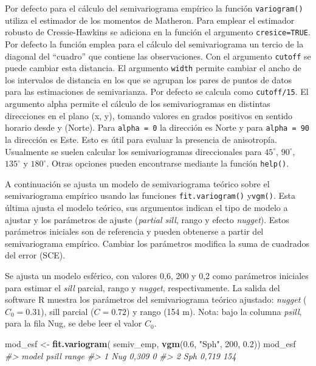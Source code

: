 \documentclass[11pt,b5paper,]{krantz}
\newenvironment{Shaded}{}{}
\newcommand{\CommentTok}[1]{\textcolor[rgb]{0.38,0.63,0.69}{\textit{#1}}}
\newcommand{\DecValTok}[1]{\textcolor[rgb]{0.25,0.63,0.44}{#1}}
\newcommand{\FloatTok}[1]{\textcolor[rgb]{0.25,0.63,0.44}{#1}}
\newcommand{\KeywordTok}[1]{\textcolor[rgb]{0.00,0.44,0.13}{\textbf{#1}}}
\newcommand{\NormalTok}[1]{#1}
\newcommand{\StringTok}[1]{\textcolor[rgb]{0.25,0.44,0.63}{#1}}
\begin{document}
Por defecto para el cálculo del semivariograma empírico la función \texttt{variogram()} utiliza el estimador de los momentos de Matheron. Para emplear el estimador robusto de Cressie-Hawkins se adiciona en la función el argumento \texttt{cresice=TRUE}. Por defecto la función emplea para el cálculo del semivariograma un tercio de la diagonal del ``cuadro'' que contiene las observaciones. Con el argumento \texttt{cutoff} se puede cambiar esta distancia. El argumento \texttt{width} permite cambiar el ancho de los intervalos de distancia en los que se agrupan los pares de puntos de datos para las estimaciones de semivarianza. Por defecto se calcula como \texttt{cutoff/15}. El argumento alpha permite el cálculo de los semivariogramas en distintas direcciones en el plano (x, y), tomando valores en grados positivos en sentido horario desde y (Norte). Para \texttt{alpha\ =\ 0} la dirección es Norte y para \texttt{alpha\ =\ 90} la dirección es Este. Esto es útil para evaluar la presencia de anisotropía. Usualmente se suelen calcular los semivariogramas direccionales para \(45^\circ\), \(90^\circ\), \(135^\circ\) y \(180^\circ\). Otras opciones pueden encontrarse mediante la función \texttt{help()}.

A continuación se ajusta un modelo de semivariograma teórico sobre el semivariograma empírico usando las funciones \texttt{fit.variogram()} y\texttt{vgm()}. Esta última ajusta el modelo teórico, sus argumentos indican el tipo de modelo a ajustar y los parámetros de ajuste (\emph{partial sill}, rango y efecto \emph{nugget}). Estos parámetros iniciales son de referencia y pueden obtenerse a partir del semivariograma empírico. Cambiar los parámetros modifica la suma de cuadrados del error (SCE).

Se ajusta un modelo esférico, con valores 0,6, 200 y 0,2 como parámetros iniciales para estimar el \emph{sill} parcial, rango y \emph{nugget}, respectivamente. La salida del software R muestra los parámetros del semivariograma teórico ajustado: \emph{nugget} (\(C_0=0.31\)), sill parcial (\(C=0.72\)) y rango (154 m). Nota: bajo la columna \emph{psill}, para la fila Nug, se debe leer el valor \(C_0\).

\begin{Shaded}
\begin{Highlighting}[]
\NormalTok{mod_esf <-}\StringTok{ }\KeywordTok{fit.variogram}\NormalTok{(}
\NormalTok{  semiv_emp,}
  \KeywordTok{vgm}\NormalTok{(}\FloatTok{0.6}\NormalTok{, }\StringTok{"Sph"}\NormalTok{, }\DecValTok{200}\NormalTok{, }\FloatTok{0.2}\NormalTok{))}
\NormalTok{mod_esf}
\CommentTok{#>   model psill range}
\CommentTok{#> 1   Nug 0,309     0}
\CommentTok{#> 2   Sph 0,719   154}
\end{Highlighting}
\end{Shaded}
\end{document}
